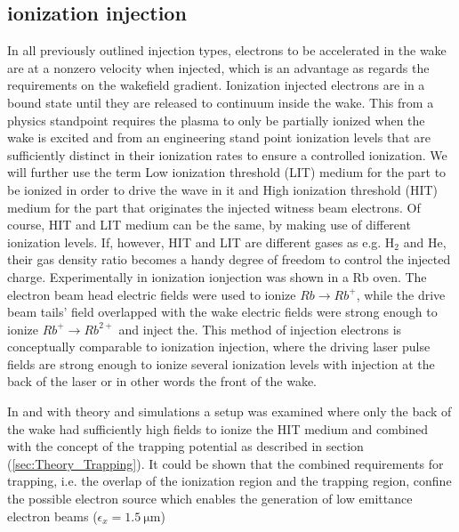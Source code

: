 \subsection{ionization injection}
In all previously outlined injection types, electrons to be accelerated in the wake are at a nonzero velocity when injected, which is an advantage as regards the requirements on the wakefield gradient. Ionization injected electrons are in a bound state until they are released to continuum inside the wake. This from a physics standpoint requires the plasma to only be partially ionized when the wake is excited and from an engineering stand point ionization levels that are sufficiently distinct in their ionization rates to ensure a controlled ionization. We will further use the term Low ionization threshold (LIT) medium for the part to be ionized in order to drive the wave in it and High ionization threshold (HIT) medium for the part that originates the injected witness beam electrons. Of course, HIT and LIT medium can be the same, by making use of different ionization levels. If, however, HIT and LIT are different gases as e.g. H$_2$ and He, their gas density ratio becomes a handy degree of freedom to control the injected charge.
Experimentally in \cite{Navid_distributed_PRL} ionization ionjection was shown in a Rb oven. The electron beam head electric fields were used to ionize $Rb\rightarrow Rb^+$, while the drive beam tails' field overlapped with the wake electric fields were strong enough to ionize $Rb^+ \rightarrow Rb^{2+}$ and inject the. This method of injection electrons is conceptually comparable to ionization injection, where the driving laser pulse fields are strong enough to ionize several ionization levels with injection at the back of the laser or in other words the front of the wake\cite{Pak_Ion_InjectionPRL2010}.

In \cite{Ossa_Rake_PRL2013} and \cite{MartinezdelaOssa2014231} with theory and simulations a setup was examined where only the back of the wake had sufficiently high fields to ionize the HIT medium and combined with the concept of the trapping potential as described in section (\ref{sec:Theory_Trapping}). It could be shown that the combined requirements for trapping, i.e. the overlap of the ionization region and the trapping region, confine the possible electron source which enables the generation of low emittance electron beams ($\epsilon_x=1.5\ \mathrm{\mu m}$) 





